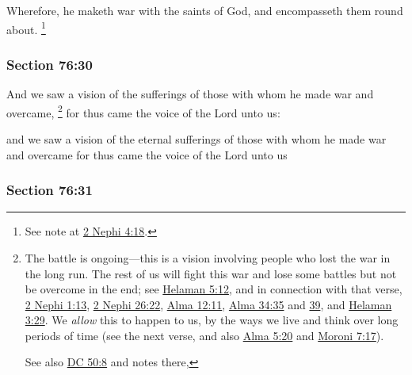 		Wherefore, he maketh war with the saints of God, and encompasseth
		them round about.%
			\footnote{%
				\label{DC76-29-encompasseth}%
				See note at \hyperref[2NEPHI-4-18]{2 Nephi 4:18}.
				}


	\subsubsection{Section 76:30} %
		\label{DC76-30}

		And we saw a vision of the sufferings of those with whom he made war and overcame,%
			\footnote{%
				The battle is ongoing---this is a vision involving people who lost the war in the long run. The rest of us will fight this war and lose some battles but not be overcome in the end; see \hyperref[HELAMAN-5-12]{Helaman 5:12}, and in connection with that verse, \hyperref[2NEPHI-1-13]{2 Nephi 1:13}, \hyperref[2NEPHI-26-22]{2 Nephi 26:22}, \hyperref[ALMA-12-11]{Alma 12:11}, \hyperref[ALMA-34-35]{Alma 34:35} and \hyperref[ALMA-34-39]{39}, and \hyperref[HELAMAN-3-29]{Helaman 3:29}. We \textit{allow} this to happen to us, by the ways we live and think over long periods of time (see the next verse, and also \hyperref[ALMA-5-20]{Alma 5:20} and \hyperref[MORONI-7-17]{Moroni 7:17}).
				
				See also \hyperref[DC50-8]{DC 50:8} and notes there, 
				}
		for thus came the voice of the Lord unto us:

		\begin{framed}
		\scriptsize
			\begin{compactdesc}
				\item[JSP] and we saw a vision of the eternal sufferings of those with whom he made war and overcame for thus came the voice of the Lord unto us
			\end{compactdesc}
		\end{framed}

	\subsubsection{Section 76:31} %
		\label{DC76-31}

